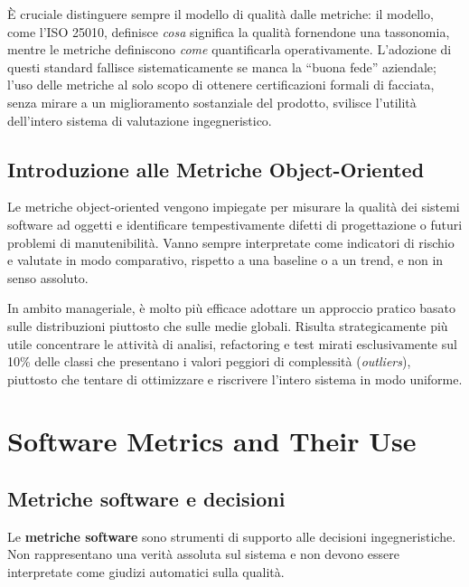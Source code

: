 \begin{notaprof}
È cruciale distinguere sempre il modello di qualità dalle metriche: il modello, come l'ISO 25010, definisce \textit{cosa} significa la qualità fornendone una tassonomia, mentre le metriche definiscono \textit{come} quantificarla operativamente. L'adozione di questi standard fallisce sistematicamente se manca la ``buona fede'' aziendale; l'uso delle metriche al solo scopo di ottenere certificazioni formali di facciata, senza mirare a un miglioramento sostanziale del prodotto, svilisce l'utilità dell'intero sistema di valutazione ingegneristico.
\end{notaprof}

\section{Introduzione alle Metriche Object-Oriented}
Le metriche object-oriented vengono impiegate per misurare la qualità dei sistemi software ad oggetti e identificare tempestivamente difetti di progettazione o futuri problemi di manutenibilità. Vanno sempre interpretate come indicatori di rischio e valutate in modo comparativo, rispetto a una baseline o a un trend, e non in senso assoluto.

\begin{notaprof}
In ambito manageriale, è molto più efficace adottare un approccio pratico basato sulle distribuzioni piuttosto che sulle medie globali. Risulta strategicamente più utile concentrare le attività di analisi, refactoring e test mirati esclusivamente sul 10\% delle classi che presentano i valori peggiori di complessità (\textit{outliers}), piuttosto che tentare di ottimizzare e riscrivere l'intero sistema in modo uniforme.
\end{notaprof}

\chapter{Software Metrics and Their Use}

\section{Metriche software e decisioni}

Le \textbf{metriche software} sono strumenti di supporto alle decisioni ingegneristiche. Non rappresentano una verità assoluta sul sistema e non devono essere interpretate come giudizi automatici sulla qualità.

